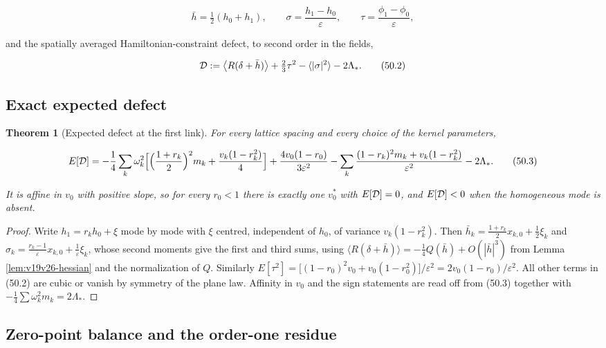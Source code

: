 \documentclass[11pt]{article}
\newtheorem{theorem}{Theorem}[section]
\theoremstyle{remark}
\begin{document}
\[
 \bar h=\tfrac12(h_0+h_1),\qquad
 \sigma=\frac{h_1-h_0}{\varepsilon},\qquad
 \tau=\frac{\phi_1-\phi_0}{\varepsilon},                              \tag{50.1}
\]

and the spatially averaged Hamiltonian-constraint defect, to second
order in the fields,

\[
 {\cal D}:=\bigl\langle R(\delta+\bar h)\bigr\rangle+\tfrac23\tau^2
 -\langle|\sigma|^2\rangle-2\Lambda_*.                                 \tag{50.2}
\]

\subsection{Exact expected defect}

\begin{theorem}[Expected defect at the first link]
\label{thm:v19v47-defect}
For every lattice spacing and every choice of the kernel parameters,

\[
 E[{\cal D}]
 =-\frac14\sum_k\omega_k^2\Bigl[\Bigl(\frac{1+r_k}2\Bigr)^2m_k+\frac{v_k(1-r_k^2)}4\Bigr]
 +\frac{4v_0(1-r_0)}{3\varepsilon^2}
 -\sum_k\frac{(1-r_k)^2m_k+v_k(1-r_k^2)}{\varepsilon^2}
 -2\Lambda_*.                                                          \tag{50.3}
\]

It is affine in \(v_0\) with positive slope, so for every \(r_0<1\)
there is exactly one \(v_0^*\) with \(E[{\cal D}]=0\), and
\(E[{\cal D}]<0\) when the homogeneous mode is absent.
\end{theorem}

\begin{proof}
Write \(h_1=r_kh_0+\xi\) mode by mode with \(\xi\) centred, independent
of \(h_0\), of variance \(v_k(1-r_k^2)\).  Then
\(\bar h_k=\tfrac{1+r_k}2x_{k,0}+\tfrac12\xi_k\) and
\(\sigma_k=\tfrac{r_k-1}\varepsilon x_{k,0}+\tfrac1\varepsilon\xi_k\),
whose second moments give the first and third sums, using
\(\langle R(\delta+\bar h)\rangle=-\tfrac14Q(\bar h)+O(|\bar h|^3)\)
from Lemma \ref{lem:v19v26-hessian} and the normalization of \(Q\).
Similarly \(E[\tau^2]=\bigl[(1-r_0)^2v_0+v_0(1-r_0^2)\bigr]/\varepsilon^2
=2v_0(1-r_0)/\varepsilon^2\).  All other terms in (50.2) are cubic or
vanish by symmetry of the plane law.  Affinity in \(v_0\) and the sign
statements are read off from (50.3) together with
\(-\tfrac14\sum\omega_k^2m_k=2\Lambda_*\).
\end{proof}

\subsection{Zero-point balance and the order-one residue}
\end{document}
